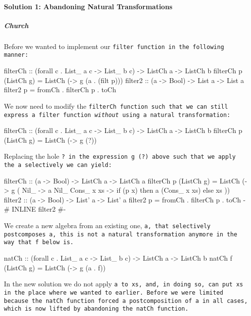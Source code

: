 \paragraph{Solution 1: Abandoning Natural Transformations}
\subparagraph{Church} Before we wanted to implement our \tt{filter} function in the following manner:
\begin{spec}
filterCh :: (forall c . List_ a c -> List_ b c) -> ListCh a -> ListCh b
filterCh p (ListCh g) = ListCh (\a -> g (a . (filt p)))
filter2 :: (a -> Bool) -> List a -> List a
filter2 p = fromCh . filterCh p . toCh
\end{spec}
We now need to modify the \tt{filterCh} function such that we can still express a filter function \textit{without} using a natural transformation:
\begin{spec}
filterCh :: (forall c . List_ a c -> List_ b c) -> ListCh a -> ListCh b
filterCh p (ListCh g) = ListCh (\a -> g (?))
\end{spec}
Replacing the hole \tt{?} in the expression \tt{g (?)} above such that we apply the \tt{a} selectively we can yield:
\begin{code}
filterCh :: (a -> Bool) -> ListCh a -> ListCh a
filterCh p (ListCh g) = ListCh (\a -> g (\case
    Nil_ -> a Nil_
    Cons_ x xs -> if (p x) then a (Cons_ x xs) else xs
  ))
filter2 :: (a -> Bool) -> List' a -> List' a
filter2 p = fromCh . filterCh p . toCh
{-# INLINE filter2 #-}
\end{code}
We create a new algebra from an existing one, \tt{a}, that selectively postcomposes \tt{a}, this is not a natural transformation anymore in the way that \tt{f} below is.
\begin{spec}
natCh :: (forall c . List_ a c -> List_ b c) -> ListCh a -> ListCh b
natCh f (ListCh g) = ListCh (\a -> g (a . f))
\end{spec}
In the new solution we do not apply \tt{a} to \tt{xs}, and, in doing so, can put \tt{xs} in the place where we wanted to earlier.
Before we were limited because the \tt{natCh} function forced a postcomposition of \tt{a} in all cases, which is now lifted by abandoning the \tt{natCh} function.




